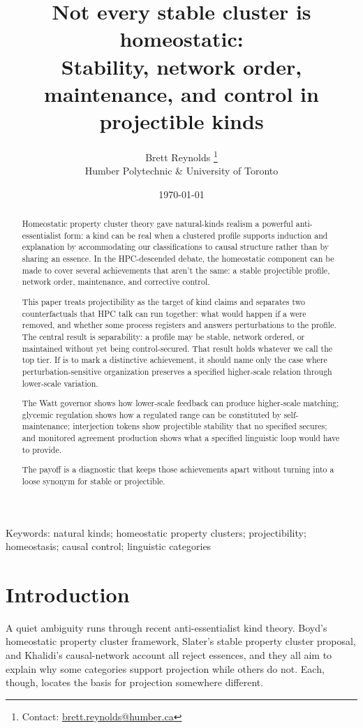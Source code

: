 \documentclass[12pt]{article}
\title{Not every stable cluster is homeostatic:\\ Stability, network order, maintenance, and control in projectible kinds}
\author{}
\date{}
\author{Brett Reynolds \orcidlink{0000-0003-0073-7195}%
\thanks{Contact: \href{mailto:brett.reynolds@humber.ca}{brett.reynolds@humber.ca}}\\
Humber Polytechnic \& University of Toronto}
\date{\today}
\begin{document}
\maketitle

\begin{abstract}
Homeostatic property cluster theory gave natural-kinds realism a powerful
anti-essentialist form: a kind can be real when a clustered profile supports
induction and explanation by accommodating our classifications to causal
structure rather than by sharing an essence. In the HPC-descended debate, the
homeostatic component can be made to cover several achievements that aren't the
same:
a stable projectible profile, network order, maintenance, and corrective control.

This paper treats projectibility as the target of kind claims and separates two
counterfactuals that HPC talk can run together: what would happen if a
 were removed, and whether some process registers and answers
perturbations to the profile. The central result is separability: a profile may
be stable, network ordered, or maintained without yet being control-secured. That
result holds whatever we call the top tier. If
 is to mark a distinctive achievement, it should name only the
case where perturbation-sensitive organization preserves a specified higher-scale
relation through lower-scale variation.

The Watt governor shows how lower-scale feedback can produce higher-scale
matching; glycemic regulation shows how a regulated range can be constituted by
self-maintenance; interjection tokens show projectible stability that no
specified  secures; and monitored agreement production shows
what a specified linguistic loop would have to provide.

The payoff is a diagnostic that keeps those achievements apart without turning
 into a loose synonym for stable or projectible.
\end{abstract}

\noindent Keywords: natural kinds; homeostatic property clusters;
projectibility; homeostasis; causal control; linguistic categories

\section{Introduction}

A quiet ambiguity runs through recent anti-essentialist kind theory. Boyd's
homeostatic property cluster framework, Slater's stable property cluster proposal,
and Khalidi's causal-network account all reject essences, and they all aim to
explain why some categories support projection while others do not. Each, though,
locates the basis for projection somewhere different.
\end{document}
